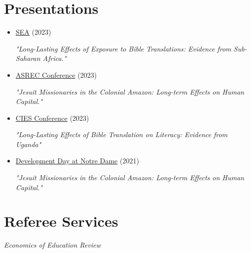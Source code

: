 \documentclass[letterpaper,11pt]{article}
\begin{document}
\section{Presentations}
\begin{adjustwidth}{3mm}{0mm}
  \begin{itemize}
    \item \href{https://www.southerneconomic.org/event/7662b305-ad92-474d-8f2c-bce1240b9858/websitePage:e0a9d079-18e0-4413-a0b6-32f8f6b51e64}{SEA} (2023) 
    
    \textit{"Long-Lasting Effects of Exposure to Bible Translations: Evidence from Sub-Saharan Africa."}
  \end{itemize}

  \begin{itemize}
    \item \href{http://www.asrec.org/conferences/}{ASREC Conference} (2023) 
    
    \textit{"Jesuit Missionaries in the Colonial Amazon: Long-term Effects on Human Capital."}
  \end{itemize}

  \begin{itemize}
    \item \href{https://cies2023.org/}{CIES Conference} (2023) 
    
    \textit{"Long-Lasting Effects of Bible Translation on Literacy: Evidence from Uganda"}
  \end{itemize}

  \begin{itemize}
    \item \href{https://kellogg.nd.edu/development-day-2021#tab-2998}{Development Day at Notre Dame} (2021) 
    
    \textit{"Jesuit Missionaries in the Colonial Amazon: Long-term Effects on Human Capital."}
  \end{itemize}
\end{adjustwidth}

\section{Referee Services}
\begin{adjustwidth}{3mm}{0mm}
\textit{Economics of Education Review}
\end{adjustwidth}
\end{document}
